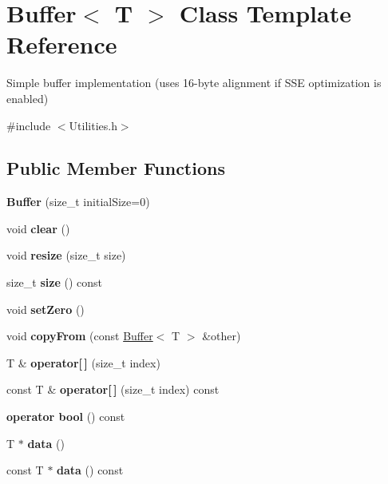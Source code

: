 \hypertarget{class_buffer}{}\section{Buffer$<$ T $>$ Class Template Reference}
\label{class_buffer}


Simple buffer implementation (uses 16-\/byte alignment if S\+SE optimization is enabled)  




{\ttfamily \#include $<$Utilities.\+h$>$}

\subsection*{Public Member Functions}
\begin{DoxyCompactItemize}
\item 
\mbox{\label{class_buffer_a54c824a6384e72ae87e3bd44aa124f24}} 
{\bfseries Buffer} (size\+\_\+t initial\+Size=0)
\item 
\mbox{\label{class_buffer_a366dcbac3789eb97c2cd775a449725e2}} 
void {\bfseries clear} ()
\item 
\mbox{\label{class_buffer_a664d17647b99c84e2785a8f4c7329b53}} 
void {\bfseries resize} (size\+\_\+t size)
\item 
\mbox{\label{class_buffer_ad9f7fda0042390e831d3de7f925b9c64}} 
size\+\_\+t {\bfseries size} () const
\item 
\mbox{\label{class_buffer_a98b1293e9be59400d8ec2d46e97478df}} 
void {\bfseries set\+Zero} ()
\item 
\mbox{\label{class_buffer_aa2085bbfead2a9edfbedf967961866c8}} 
void {\bfseries copy\+From} (const \hyperlink{class_buffer}{Buffer}$<$ T $>$ \&other)
\item 
\mbox{\label{class_buffer_a68996979745c187cb5af2286e9b34baa}} 
T \& {\bfseries operator\mbox{[}$\,$\mbox{]}} (size\+\_\+t index)
\item 
\mbox{\label{class_buffer_a843bcd9407ee341049273efe301b1b9e}} 
const T \& {\bfseries operator\mbox{[}$\,$\mbox{]}} (size\+\_\+t index) const
\item 
\mbox{\label{class_buffer_a1198f8054cfec87dee44b7933af40d8e}} 
{\bfseries operator bool} () const
\item 
\mbox{\label{class_buffer_aefcf31e86d928d0229fe4f73f9d347b5}} 
T $\ast$ {\bfseries data} ()
\item 
\mbox{\label{class_buffer_a86995457bb362b60541f26e0bf9910ff}} 
const T $\ast$ {\bfseries data} () const
\end{DoxyCompactItemize}
